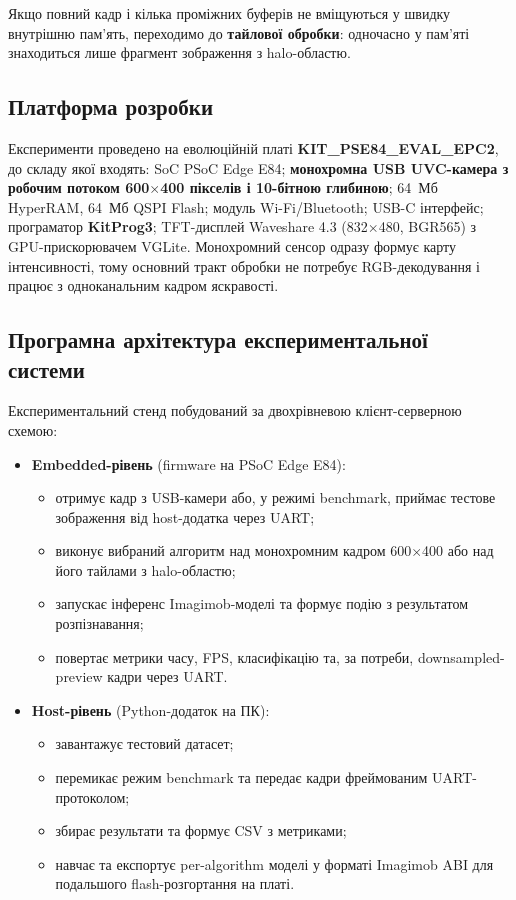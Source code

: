 \documentclass[a4paper,12pt]{article}
\begin{document}
Якщо повний кадр і кілька проміжних буферів не вміщуються у швидку внутрішню пам'ять, переходимо до \textbf{тайлової обробки}: одночасно у пам'яті знаходиться лише фрагмент зображення з halo-областю.

\subsection{Платформа розробки}

Експерименти проведено на еволюційній платі \textbf{KIT\_PSE84\_EVAL\_EPC2}, до складу якої входять: SoC PSoC\texttrademark{} Edge E84; \textbf{монохромна USB UVC-камера з робочим потоком 600$\times$400 пікселів і 10-бітною глибиною}; 64~Мб HyperRAM, 64~Мб QSPI Flash; модуль Wi-Fi/Bluetooth; USB-C інтерфейс; програматор \textbf{KitProg3}; TFT-дисплей Waveshare 4.3\textquotedbl{} (832$\times$480, BGR565) з GPU-прискорювачем VGLite. Монохромний сенсор одразу формує карту інтенсивності, тому основний тракт обробки не потребує RGB-декодування і працює з одноканальним кадром яскравості.

\subsection{Програмна архітектура експериментальної системи}

Експериментальний стенд побудований за двохрівневою клієнт-серверною схемою:

\begin{itemize}
	\item \textbf{Embedded-рівень} (firmware на PSoC Edge E84):
	\begin{itemize}
		\item отримує кадр з USB-камери або, у режимі benchmark, приймає тестове зображення від host-додатка через UART;
		\item виконує вибраний алгоритм над монохромним кадром 600$\times$400 або над його тайлами з halo-областю;
		\item запускає інференс Imagimob-моделі та формує подію з результатом розпізнавання;
		\item повертає метрики часу, FPS, класифікацію та, за потреби, downsampled-preview кадри через UART.
	\end{itemize}
	\item \textbf{Host-рівень} (Python-додаток на ПК):
	\begin{itemize}
		\item завантажує тестовий датасет;
		\item перемикає режим benchmark та передає кадри фреймованим UART-протоколом;
		\item збирає результати та формує CSV з метриками;
		\item навчає та експортує per-algorithm моделі у форматі Imagimob ABI для подальшого flash-розгортання на платі.
	\end{itemize}
\end{itemize}
\end{document}
